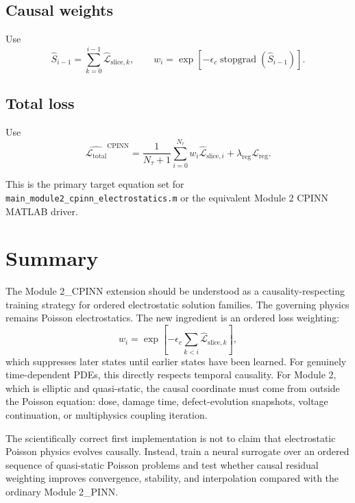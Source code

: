 \documentclass[11pt]{article}
\newcommand{\Lreg}{\mathcal{L}_{\mathrm{reg}}}
\newcommand{\Ltot}{\mathcal{L}_{\mathrm{total}}}
\newcommand{\taud}{\tau}
\newcommand{\stgrad}{\operatorname{stopgrad}}
\begin{document}
\subsection{Causal weights}

Use
\begin{equation}
\hat{S}_{i-1}=\sum_{k=0}^{i-1}\widehat{\mathcal{L}}_{\mathrm{slice},k},
\qquad
w_i=\exp\left[-\epsilon_c\stgrad(\hat{S}_{i-1})\right].
\end{equation}

\subsection{Total loss}

Use
\begin{equation}
\hat{\Ltot}^{\mathrm{CPINN}}=
\frac{1}{N_\taud+1}\sum_{i=0}^{N_\taud}w_i\widehat{\mathcal{L}}_{\mathrm{slice},i}
+\lambda_{\mathrm{reg}}\Lreg.
\end{equation}

This is the primary target equation set for \texttt{main\_module2\_cpinn\_electrostatics.m} or the equivalent Module 2 CPINN MATLAB driver.

\section{Summary}

The Module 2\_CPINN extension should be understood as a causality-respecting training strategy for ordered electrostatic solution families. The governing physics remains Poisson electrostatics. The new ingredient is an ordered loss weighting:
\begin{equation}
w_i=\exp\left[-\epsilon_c\sum_{k<i}\widehat{\mathcal{L}}_{\mathrm{slice},k}\right],
\end{equation}
which suppresses later states until earlier states have been learned. For genuinely time-dependent PDEs, this directly respects temporal causality. For Module 2, which is elliptic and quasi-static, the causal coordinate must come from outside the Poisson equation: dose, damage time, defect-evolution snapshots, voltage continuation, or multiphysics coupling iteration.

The scientifically correct first implementation is not to claim that electrostatic Poisson physics evolves causally. Instead, train a neural surrogate over an ordered sequence of quasi-static Poisson problems and test whether causal residual weighting improves convergence, stability, and interpolation compared with the ordinary Module 2\_PINN.
\end{document}
